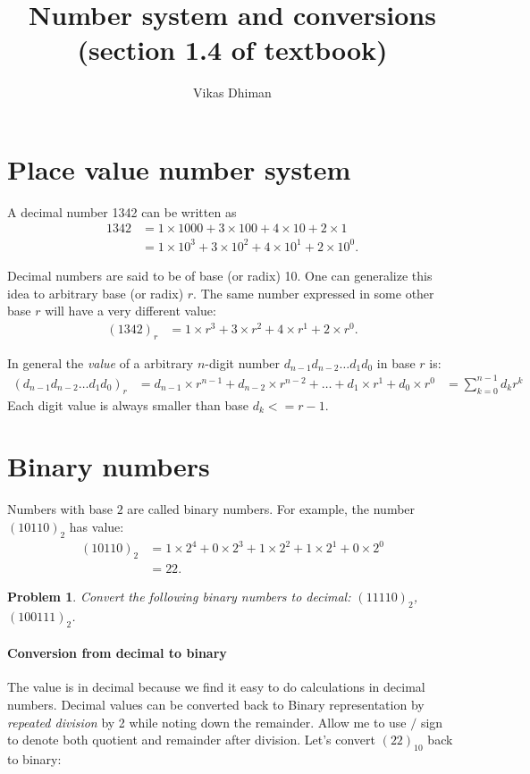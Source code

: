 \documentclass{article}
\title{Number system and conversions (section 1.4 of textbook)}
\author{Vikas Dhiman}
\newtheorem{prob}{Problem}
\begin{document}
\maketitle

\section{Place value number system}

A decimal number 1342 can be written as
\begin{align*}
  1342&=1\times1000 + 3\times100 + 4\times10 + 2\times1
        \\
      &=1\times10^3 + 3\times10^2+4\times10^1 + 2\times10^0.
\end{align*}

Decimal numbers are said to be of base (or radix) 10. One can generalize this
idea to arbitrary base (or radix) $r$. The same number expressed in some other
base $r$ will have a very different value:
\begin{align*}
  (1342)_r &=1\times r^3 + 3\times r^2+4\times r^1 + 2\times r^0.
\end{align*}

In general the \emph{value} of a arbitrary $n$-digit number $d_{n-1}d_{n-2}
\dots d_1 d_0$ in base $r$ is:
\begin{align*}
  (d_{n-1}d_{n-2} \dots d_1 d_0)_r &=d_{n-1} \times r^{n-1} + d_{n-2}\times r^{n-2}+ \dots + d_1\times r^1 + d_0\times r^0 &= \sum_{k=0}^{n-1} d_k r^k
\end{align*}
Each digit value is always smaller than base $d_k <= r-1$.

\section{Binary numbers}

Numbers with base $2$ are called binary numbers. For example, the number
$(10110)_2$ has value:
\begin{align*}
  (10110)_2 &= 1 \times 2^4+ 0 \times 2^3 + 1\times 2^2 + 1 \times 2^1+ 0\times 2^0
              \\
            &= 22.
\end{align*}

\begin{prob}
  Convert the following binary numbers to decimal: $(11110)_2$, $(100111)_2$.
\end{prob}
\vspace{10em}

\paragraph{Conversion from decimal to binary}
The value is in decimal because we find it easy to do calculations in decimal
numbers. Decimal values can be converted back to Binary representation by
\emph{repeated division} by 2 while noting down the remainder. Allow me
to use $/$ sign to denote both quotient and remainder after division. Let's convert $(22)_{10}$
back to binary: 
\end{document}
